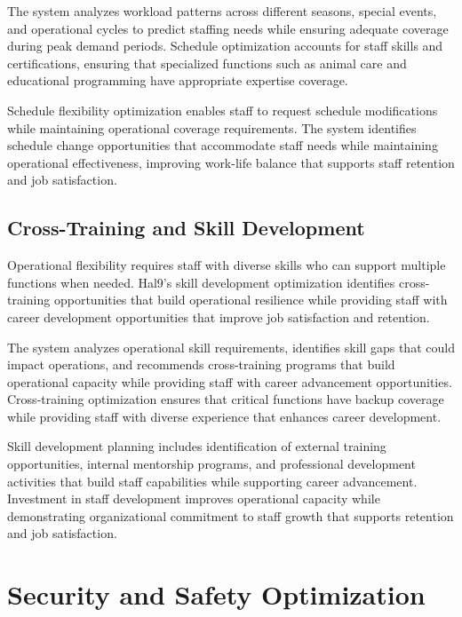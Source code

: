 \documentclass[
  Letterpaper,
]{scrbook}
\begin{document}
The system analyzes workload patterns across different seasons, special
events, and operational cycles to predict staffing needs while ensuring
adequate coverage during peak demand periods. Schedule optimization
accounts for staff skills and certifications, ensuring that specialized
functions such as animal care and educational programming have
appropriate expertise coverage.

Schedule flexibility optimization enables staff to request schedule
modifications while maintaining operational coverage requirements. The
system identifies schedule change opportunities that accommodate staff
needs while maintaining operational effectiveness, improving work-life
balance that supports staff retention and job satisfaction.

\subsection{Cross-Training and Skill
Development}\label{cross-training-and-skill-development}

Operational flexibility requires staff with diverse skills who can
support multiple functions when needed. Hal9's skill development
optimization identifies cross-training opportunities that build
operational resilience while providing staff with career development
opportunities that improve job satisfaction and retention.

The system analyzes operational skill requirements, identifies skill
gaps that could impact operations, and recommends cross-training
programs that build operational capacity while providing staff with
career advancement opportunities. Cross-training optimization ensures
that critical functions have backup coverage while providing staff with
diverse experience that enhances career development.

Skill development planning includes identification of external training
opportunities, internal mentorship programs, and professional
development activities that build staff capabilities while supporting
career advancement. Investment in staff development improves operational
capacity while demonstrating organizational commitment to staff growth
that supports retention and job satisfaction.

\section{Security and Safety
Optimization}\label{security-and-safety-optimization}
\end{document}

